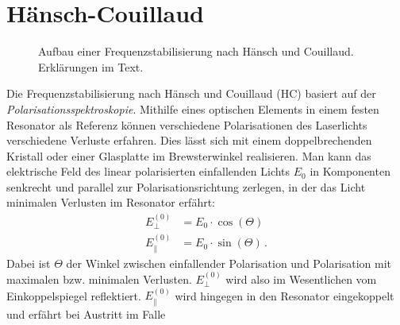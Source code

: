 \section{Hänsch-Couillaud}\label{sec:haensch-couillaud}
\begin{figure}[h]
 	\centering
	\caption[Hänsch-Couillaud-Stabilisierung - Aufbau]{Aufbau
	einer Frequenzstabilisierung nach Hänsch
	und Couillaud. Erklärungen im
	Text.}
	\label{fig:haensch-couillaud_aufbau}
\end{figure}
Die Frequenzstabilisierung nach Hänsch und Couillaud (HC)
basiert auf der \textit{Polarisationsspektroskopie}. Mithilfe eines
optischen Elements in einem festen Resonator als Referenz können verschiedene
Polarisationen des Laserlichts verschiedene Verluste erfahren. Dies lässt sich
mit einem doppelbrechenden Kristall oder einer Glasplatte im Brewsterwinkel
realisieren. Man kann das elektrische Feld des linear polarisierten einfallenden
Lichts $E_0$ in Komponenten senkrecht und parallel zur Polarisationsrichtung
zerlegen, in der das Licht minimalen Verlusten im Resonator erfährt:
\begin{equation}\label{eq:haensch-couillaud_01}
	\begin{split}
		E_{\perp}^{(0)} & = E_0\cdot\cos{(\Theta)}\\
		E_{\parallel}^{(0)} & = E_0\cdot\sin{(\Theta)}\,.
	\end{split}
\end{equation}
Dabei ist $\Theta$ der Winkel zwischen einfallender Polarisation und
Polarisation mit maximalen bzw. minimalen Verlusten. $E_{\perp}^{(0)}$ wird also
im Wesentlichen vom Einkoppelspiegel reflektiert. $E_{\parallel}^{(0)}$
wird hingegen in den Resonator eingekoppelt und erfährt bei Austritt im Falle
